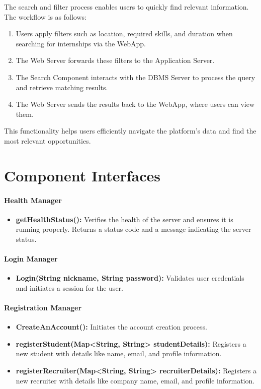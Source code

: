 The search and filter process enables users to quickly find relevant information. The workflow is as follows:
\begin{enumerate}
    \item Users apply filters such as location, required skills, and duration when searching for internships via the WebApp.
    \item The Web Server forwards these filters to the Application Server.
    \item The Search Component interacts with the DBMS Server to process the query and retrieve matching results.
    \item The Web Server sends the results back to the WebApp, where users can view them.
\end{enumerate}
This functionality helps users efficiently navigate the platform's data and find the most relevant opportunities.

\section{Component Interfaces}
\label{subsec:component_interfaces}

\paragraph{Health Manager}
\begin{itemize}
    \item \textbf{getHealthStatus():} Verifies the health of the server and ensures it is running properly. Returns a status code and a message indicating the server status.
\end{itemize}

\paragraph{Login Manager}
\begin{itemize}
    \item \textbf{Login(String nickname, String password):} Validates user credentials and initiates a session for the user.
\end{itemize}

\paragraph{Registration Manager}
\begin{itemize}
    \item \textbf{CreateAnAccount():} Initiates the account creation process.
    \item \textbf{registerStudent(Map<String, String> studentDetails):} Registers a new student with details like name, email, and profile information.
    \item \textbf{registerRecruiter(Map<String, String> recruiterDetails):} Registers a new recruiter with details like company name, email, and profile information.
\end{itemize}


